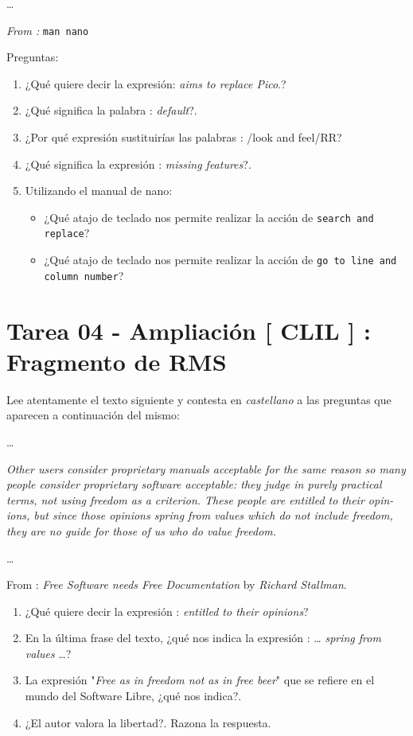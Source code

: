 \documentclass[11pt]{article}
\begin{document}
\ldots{} 

\emph{From :}  \texttt{man nano}

Preguntas:

\begin{enumerate}
\item ¿Qué quiere decir la expresión: \emph{aims to replace Pico}.?
\item ¿Qué significa la palabra : \emph{default}?.
\item ¿Por qué expresión sustituirías las palabras : /look and feel/RR?
\item ¿Qué significa la expresión : \emph{missing features}?.
\item Utilizando el manual de nano:

\begin{itemize}
\item ¿Qué atajo de teclado nos permite realizar la acción de \texttt{search and replace}?
\item ¿Qué atajo de teclado nos permite realizar la acción de \texttt{go to line and column number}?
\end{itemize}
\end{enumerate}

\section{Tarea 04 - Ampliación [ CLIL ] : Fragmento de RMS}
\label{sec:orgf782963}

Lee atentamente el texto siguiente y contesta en \emph{castellano} a las 
preguntas que aparecen a continuación del mismo:

\ldots{}

\emph{Other users consider proprietary manuals acceptable for the same reason so many}
\emph{people consider proprietary software acceptable: they judge in purely practical}
\emph{terms, not using freedom as a criterion. These people are entitled to their opin-}
\emph{ions, but since those opinions spring from values which do not include freedom,}
\emph{they are no guide for those of us who do value freedom.}

\ldots{}

From : \emph{Free Software needs Free Documentation} by \emph{Richard Stallman}.


\begin{enumerate}
\item ¿Qué quiere decir la expresión : \emph{entitled to their opinions}?
\item En la última frase del texto, ¿qué nos indica la expresión : \ldots{} \emph{spring from values} \ldots{}?
\item La expresión "\emph{Free as in freedom not as in free beer}" que se refiere en el mundo del Software Libre, ¿qué nos indica?.
\item ¿El autor valora la libertad?. Razona la respuesta.
\end{enumerate}
\end{document}
